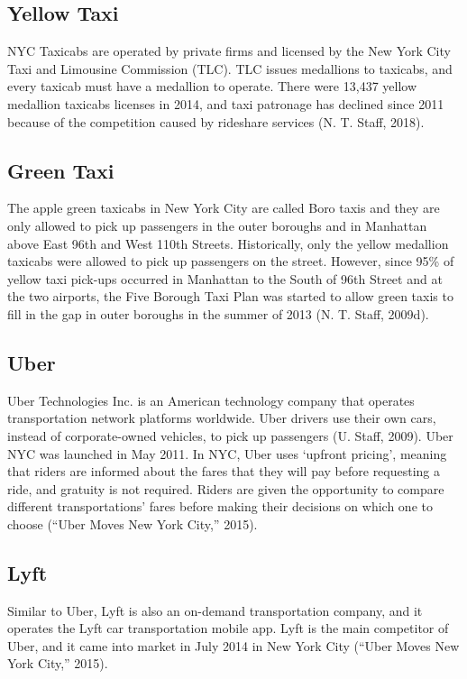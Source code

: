 \documentclass[12pt,twoside]{reedthesis}
\theoremstyle{definition}
\theoremstyle{definition}
\theoremstyle{definition}
\theoremstyle{remark}
\begin{document}
\subsection{Yellow Taxi}\label{yellow-taxi}

NYC Taxicabs are operated by private firms and licensed by the New York
City Taxi and Limousine Commission (TLC). TLC issues medallions to
taxicabs, and every taxicab must have a medallion to operate. There were
13,437 yellow medallion taxicabs licenses in 2014, and taxi patronage
has declined since 2011 because of the competition caused by rideshare
services (N. T. Staff, 2018).

\subsection{Green Taxi}\label{green-taxi}

The apple green taxicabs in New York City are called Boro taxis and they
are only allowed to pick up passengers in the outer boroughs and in
Manhattan above East 96th and West 110th Streets. Historically, only the
yellow medallion taxicabs were allowed to pick up passengers on the
street. However, since 95\% of yellow taxi pick-ups occurred in
Manhattan to the South of 96th Street and at the two airports, the Five
Borough Taxi Plan was started to allow green taxis to fill in the gap in
outer boroughs in the summer of 2013 (N. T. Staff, 2009d).

\subsection{Uber}\label{uber}

Uber Technologies Inc. is an American technology company that operates
transportation network platforms worldwide. Uber drivers use their own
cars, instead of corporate-owned vehicles, to pick up passengers (U.
Staff, 2009). Uber NYC was launched in May 2011. In NYC, Uber uses
`upfront pricing', meaning that riders are informed about the fares that
they will pay before requesting a ride, and gratuity is not required.
Riders are given the opportunity to compare different transportations'
fares before making their decisions on which one to choose (``Uber Moves
New York City,'' 2015).

\subsection{Lyft}\label{lyft}

Similar to Uber, Lyft is also an on-demand transportation company, and
it operates the Lyft car transportation mobile app. Lyft is the main
competitor of Uber, and it came into market in July 2014 in New York
City (``Uber Moves New York City,'' 2015).
\end{document}
